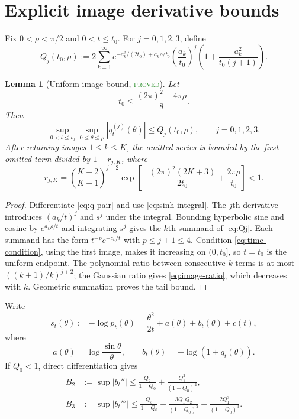 \documentclass[11pt]{article}
\newtheorem{lemma}[theorem]{Lemma}
\theoremstyle{definition}
\newcommand{\statusproved}{\textcolor{ForestGreen}{\textsc{proved}}}
\begin{document}
\section{Explicit image derivative bounds}

Fix $0<\rho<\pi/2$ and $0<t\le t_0$.  For $j=0,1,2,3$, define
\begin{equation}\label{eq:Qj}
 Q_j(t_0,\rho):=
 2\sum_{k=1}^{\infty}
 e^{-a_k^2/(2t_0)+a_k\rho/t_0}
 \left(\frac{a_k}{t_0}\right)^j
 \left(1+\frac{a_k^2}{t_0(j+1)}\right).
\end{equation}

\begin{lemma}[Uniform image bound, \statusproved]\label{lem:image-bound}
Let
\begin{equation}\label{eq:time-condition}
 t_0\le \frac{(2\pi)^2-4\pi\rho}{8}.
\end{equation}
Then
\[
 \sup_{0<t\le t_0}\sup_{0\le\theta\le\rho}
 |q_t^{(j)}(\theta)|\le Q_j(t_0,\rho),
 \qquad j=0,1,2,3.
\]
After retaining images $1\le k\le K$, the omitted series is bounded by the
first omitted term divided by $1-r_{j,K}$, where
\begin{equation}\label{eq:image-ratio}
 r_{j,K}=\left(\frac{K+2}{K+1}\right)^{j+2}
 \exp\left[-\frac{(2\pi)^2(2K+3)}{2t_0}
 +\frac{2\pi\rho}{t_0}\right]<1.
\end{equation}
\end{lemma}
\begin{proof}
Differentiate \eqref{eq:q-pair} and use
\eqref{eq:sinh-integral}.  The $j$th derivative introduces
$(a_k/t)^j$ and $s^j$ under the integral.  Bounding hyperbolic sine and cosine
by $e^{a_k\rho/t}$ and integrating $s^j$ gives the $k$th summand of
\eqref{eq:Qj}.  Each summand has the form $t^{-p}e^{-c_k/t}$ with
$p\le j+1\le4$.  Condition \eqref{eq:time-condition}, using the first image,
makes it increasing on $(0,t_0]$, so $t=t_0$ is the uniform endpoint.  The
polynomial ratio between consecutive $k$ terms is at most
$((k+1)/k)^{j+2}$; the Gaussian ratio gives \eqref{eq:image-ratio}, which
decreases with $k$.  Geometric summation proves the tail bound.
\end{proof}

Write
\begin{equation}\label{eq:action-factor}
 s_t(\theta):=-\log p_t(\theta)
 =\frac{\theta^2}{2t}+a(\theta)+b_t(\theta)+c(t),
\end{equation}
where
\[
 a(\theta)=\log\frac{\sin\theta}{\theta},
 \qquad b_t(\theta)=-\log(1+q_t(\theta)).
\]
If $Q_0<1$, direct differentiation gives
\begin{align}
 B_2&:=\sup|b_t''|
 \le \frac{Q_2}{1-Q_0}+\frac{Q_1^2}{(1-Q_0)^2},\label{eq:B2}\\
 B_3&:=\sup|b_t'''|
 \le \frac{Q_3}{1-Q_0}
 +\frac{3Q_1Q_2}{(1-Q_0)^2}
 +\frac{2Q_1^3}{(1-Q_0)^3}.\label{eq:B3}
\end{align}
\end{document}
